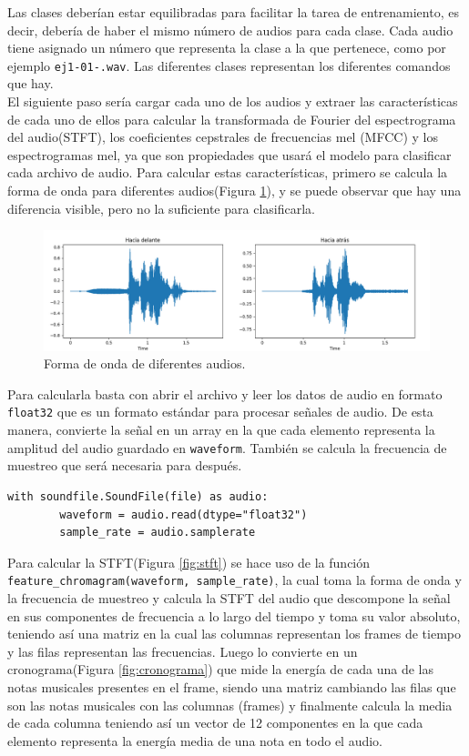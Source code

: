 Las clases deberían estar equilibradas para facilitar la tarea de entrenamiento, es decir, debería de haber el mismo número de audios para cada clase. Cada audio tiene asignado un número que representa la clase a la que pertenece, como por ejemplo \texttt{ej1-01-.wav}. Las diferentes clases representan los diferentes comandos que hay.\\


 El siguiente paso sería cargar cada uno de los audios y extraer las características de cada uno de ellos para calcular la transformada de Fourier del espectrograma del audio(STFT), los coeficientes cepstrales de frecuencias mel (MFCC) y los espectrogramas mel, ya que son propiedades que usará el modelo para clasificar cada archivo de audio. Para calcular estas características, primero se calcula la forma de onda para diferentes audios(Figura \ref{fig:onda}), y se puede observar que hay una diferencia visible, pero no la suficiente para clasificarla.
 
 \begin{figure}[H]
  \centering
  \includegraphics[scale=0.3]{figs/forma_onda} %
  \caption{ Forma de onda de diferentes audios.}
  \label{fig:onda}
\end{figure}



Para calcularla basta con abrir el archivo y leer los datos de audio en formato \texttt{float32} que es un formato estándar para procesar señales de audio. De esta manera, convierte la señal en un array en la que cada elemento representa la amplitud del audio guardado en \texttt{waveform}. También se calcula la frecuencia de muestreo que será necesaria para después.

\begin{verbatim}
with soundfile.SoundFile(file) as audio:
        waveform = audio.read(dtype="float32")
        sample_rate = audio.samplerate
\end{verbatim}

Para calcular la STFT(Figura \ref{fig:stft}) se hace uso de la función \verb|feature_chromagram(waveform, sample_rate)|, la cual toma la forma de onda y la frecuencia de muestreo y calcula la STFT del audio que descompone la señal en sus componentes de frecuencia a lo largo del tiempo y toma su valor absoluto, teniendo así una matriz en la cual las columnas representan los frames de tiempo y las filas representan las frecuencias. Luego lo convierte en un cronograma(Figura \ref{fig:cronograma}) que mide la energía de cada una de las notas musicales presentes en el frame, siendo una matriz cambiando las filas que son las notas musicales con las columnas (frames) y finalmente calcula la media de cada columna teniendo así un vector de 12 componentes en la que cada elemento representa la energía media de una nota en todo el audio.


